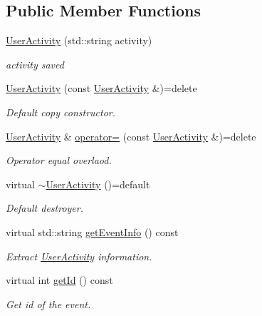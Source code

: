 \subsection*{Public Member Functions}
\begin{DoxyCompactItemize}
\item 
\hyperlink{class_spider_1_1_event_1_1_user_activity_a01787e3d65e72b720f322d393e5f7b68}{User\+Activity} (std\+::string activity)
\begin{DoxyCompactList}\small\item\em activity saved \end{DoxyCompactList}\item 
\hyperlink{class_spider_1_1_event_1_1_user_activity_ab7a38e9fbb599851895088657f62915c}{User\+Activity} (const \hyperlink{class_spider_1_1_event_1_1_user_activity}{User\+Activity} \&)=delete
\begin{DoxyCompactList}\small\item\em Default copy constructor. \end{DoxyCompactList}\item 
\hyperlink{class_spider_1_1_event_1_1_user_activity}{User\+Activity} \& \hyperlink{class_spider_1_1_event_1_1_user_activity_a063f3f10b0ecfa7f084a8047e17bea57}{operator=} (const \hyperlink{class_spider_1_1_event_1_1_user_activity}{User\+Activity} \&)=delete
\begin{DoxyCompactList}\small\item\em Operator equal overlaod. \end{DoxyCompactList}\item 
\mbox{\label{class_spider_1_1_event_1_1_user_activity_ae793fb71c0316c71f2624f410d4bc697}} 
virtual \hyperlink{class_spider_1_1_event_1_1_user_activity_ae793fb71c0316c71f2624f410d4bc697}{$\sim$\+User\+Activity} ()=default
\begin{DoxyCompactList}\small\item\em Default destroyer. \end{DoxyCompactList}\item 
virtual std\+::string \hyperlink{class_spider_1_1_event_1_1_user_activity_a72d2436a1d9b339cc1cb1950f374562f}{get\+Event\+Info} () const
\begin{DoxyCompactList}\small\item\em Extract \hyperlink{class_spider_1_1_event_1_1_user_activity}{User\+Activity} information. \end{DoxyCompactList}\item 
virtual int \hyperlink{class_spider_1_1_event_1_1_user_activity_aabcbc7060a3f015b71f0b26b475ccf75}{get\+Id} () const
\begin{DoxyCompactList}\small\item\em Get id of the event. \end{DoxyCompactList}\end{DoxyCompactItemize}
